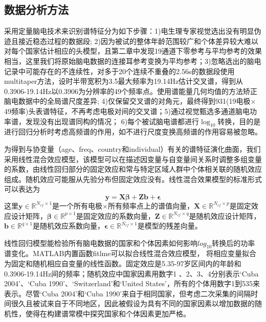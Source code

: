 \subsection{数据分析方法}\label{6ch:lme}
采用定量脑电技术来识别谱特征分为如下步骤：1)电生理专家视觉选出没有明显伪迹且接近稳态过程的数据段; 2)因为被试的整体年龄范围较广和个体差异较大难以对每个国家估计相应的头模型，且第二章中发现19通道下零参考与平均参考的效果相当，这里我们将原始脑电数据的连接耳参考变换为平均参考；3)忽略选出的脑电记录中可能存在的不连续性，对多于20个连续不重叠的2.56s的数据段使用multitaper方法，设时半带宽积为3.5最大频率为19.14Hz估计交叉谱，得到从0.3906-19.14Hz以0.3906为分辨率的49个频率点。使用谱能量几何均值的方法矫正脑电数据中的全局谱尺度差异; 4)仅保留交叉谱的对角元，最终得到931(19电极$\times$49频率)头表谱特征，不再考虑电极对间的交叉谱；5)通过视觉甄选多通道脑电功率谱，发现没有出现谱同构的情况； 6)每个被试脑电谱都进行$\log_{10}$转换，目的是进行回归分析时考虑高频谱的作用，如不进行尺度变换高频谱的作用容易被忽略。

为得到与协变量（age、freq、country和individual）有关的谱特征演化曲面，我们采用线性混合效应模型，该模型可以在描述因变量与自变量间关系时调整多组变量的系数，由线性回归部分的固定效应和常与特定区域人群中个体相关联的随机效应组成。随机效应可能服从先验分布但固定效应没有。线性混合效果模型的标准形式可以表达为
\begin{equation*}
\mathbf{y=X\beta+Zb+\epsilon}
\end{equation*}
这里$\mathbf{y}\in{\mathbb{R}^{N_{cf}\times{1}}}$是一个所有电极$\times$所有频率点上的谱值向量，$\mathbf{X}\in{\mathbb{R}^{N_{cf}\times{p}}}$是固定效应设计矩阵，$\mathbf{\beta}\in{\mathbb{R}^{p\times{1}}}$是固定效应的系数向量，$\mathbf{Z}\in{\mathbb{R}^{N_{cf}\times{q}}}$是随机效应设计矩阵，$\mathbf{b}\in{\mathbb{R}^{q\times{1}}}$是随机效应系数向量，$\mathbf{\epsilon}\in{\mathbb{R}^{N_{cf}\times{1}}}$是模型的残差向量。

线性回归模型能检验所有脑电数据的国家和个体因素如何影响$log_{10}$转换后的功率谱变化。MATLAB内置函数fitlme可以拟合线性混合效应模型，
将相应变量拟合为固定和随机相应自变量的线性函数。固定效应是5.35-97岁区间内的年龄和0.3906-19.14Hz间的频率；随机效应中国家因素用数字1
、2、3、4分别表示‘Cuba 2004’、‘Cuba 1990’、‘Switzerland’和‘United States’，所有的个体用数字1到535来表示。尽管‘Cuba 2004’和‘Cuba 1990’来自于相同国家，但考虑二次采集的间隔时间很久且被试来自于不同地区，因此被假设为具有不同的国家因素以增加数据的随机性，使得在构建谱常模中探究国家和个体因素更加严格。

